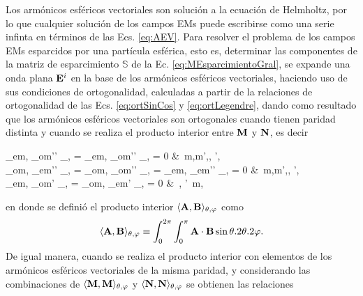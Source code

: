 Los armónicos esféricos vectoriales son solución a la ecuación de Helmholtz, por lo que cualquier solución de los campos EMs puede escribirse como una serie infinta en términos de las Ecs. \eqref{eq:AEV}. Para resolver el problema de los campos EMs esparcidos por una partícula esférica, esto es, determinar las componentes de la matriz de esparcimiento $\mathbb{S}$ de la Ec. \eqref{eq:MEsparcimientoGral}, se expande una onda plana $\vb{E}^i$ en la base de los armónicos esféricos vectoriales, haciendo uso de sus condiciones de ortogonalidad, calculadas a partir de la relaciones de ortogonalidad de las Ecs. \eqref{eq:ortSinCos} y \eqref{eq:ortLegendre}, dando como resultado que los armónicos esféricos vectoriales son ortogonales cuando tienen paridad distinta y cuando se realiza el producto interior entre $\vb{M}$ y $\vb{N}$, es decir \vspace{-.5em}
%
	\begin{tcolorbox}
		\langle{}_{em\ell}, _{om'\ell'} \rangle_{\theta,\varphi} =
		\langle{}_{em\ell}, _{om'\ell'} \rangle_{\theta,\varphi} = 0
		&\qquad \forall\,  m,m',\ell, \ell',\\
		\langle{}_{om\ell}, _{em'\ell'} \rangle_{\theta,\varphi} = 
		\langle{}_{om\ell}, _{om'\ell'} \rangle_{\theta,\varphi} = 	
		\langle{}_{em\ell}, _{em'\ell'} \rangle_{\theta,\varphi} = 0
		&\qquad \forall\,  m,m',\ell, \ell',	\\
		\langle{}_{em\ell},  _{om\ell'} \rangle_{\theta,\varphi} =
		\langle{}_{om\ell},  _{em\ell'} \rangle_{\theta,\varphi} = 0	
		&\qquad \forall\, \ell, \ell'\, m,
	\end{tcolorbox}\vspace{-.5em}\noindent
en donde se definió el producto interior $\langle \vb{A},\vb{B} \rangle_{\theta,\varphi}$ como 
	\begin{align*}
	\langle \vb{A},\vb{B} \rangle_{\theta,\varphi} 
	\equiv 
	\int_0^{2\pi}\int_0^\pi \vb{A}\cdot\vb{B} \sin\theta .2\theta .2\varphi.
	\end{align*}
De igual manera, cuando se realiza el producto interior con elementos de los armónicos esféricos vectoriales de la misma paridad, y considerando las combinaciones de  $\langle \vb{M},\vb{M}\rangle_{\theta,\varphi}$ y $\langle \vb{N},\vb{N}\rangle_{\theta,\varphi}$  se obtienen las relaciones \vspace{-.5em}
